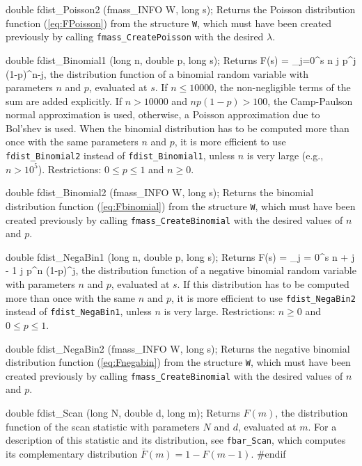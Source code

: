 double fdist_Poisson2 (fmass_INFO W, long s);
\endcode
 \tab  Returns the Poisson distribution function (\ref{eq:FPoisson})
  from the structure {\tt W}, which must have been created previously
  by calling {\tt fmass\_CreatePoisson} with the desired $\lambda$.
 \endtab
\code


double fdist_Binomial1 (long n, double p, long s);
\endcode
  \tab  Returns
  \eq
    F(s) = \sum_{j=0}^s {n \choose j}\; p^j (1-p)^{n-j},
  \endeq
  the distribution function of a binomial random variable with parameters
  $n$ and $p$, evaluated at $s$.
\ifdetailed
  If $n \le 10000$, the non-negligible terms of the sum are 
  added explicitly.
  If $n > 10000$ and $np(1-p) > 100$, the Camp-Paulson normal 
  approximation \cite{tCAM51a,tMOL70a} is used, otherwise, a Poisson
  approximation due to Bol'shev \cite{tBOL64a,tMOL70a} is used.
\fi
  When the binomial distribution has to be computed more than
  once with the same parameters $n$ and $p$, it is more efficient to use 
  {\tt fdist\_Binomial2} instead of {\tt fdist\_Binomial1}, 
  unless $n$ is very large (e.g., $n > 10^5$).
  Restrictions: $0 \le p \le 1$ and $n \ge 0$.
 \endtab
\code


double fdist_Binomial2 (fmass_INFO W, long s);
\endcode
 \tab  Returns the binomial distribution function (\ref{eq:Fbinomial})
  from the structure {\tt W}, which must have been created previously
  by calling {\tt fmass\_CreateBinomial} with the desired values of
  $n$ and $p$.
 \endtab
\code


double fdist_NegaBin1 (long n, double p, long s);
\endcode
  \tab Returns
  \eq
   F(s) = \sum_{j = 0}^s {n + j - 1 \choose j} p^n (1-p)^{j},
  \endeq
  the distribution function of a negative binomial random variable with
  parameters $n$ and $p$, evaluated at $s$. 
  If this distribution has to be computed more than
  once with the same $n$ and $p$, it is more efficient to use 
  {\tt fdist\_NegaBin2} instead of {\tt fdist\_NegaBin1},
  unless $n$ is very large. 
  Restrictions: $n \ge 0$ and $0 \le p \le 1$.
 \endtab
\code


double fdist_NegaBin2 (fmass_INFO W, long s);
\endcode
 \tab  Returns the negative binomial distribution function 
  (\ref{eq:Fnegabin}) from the structure {\tt W}, 
  which must have been created previously
  by calling {\tt fmass\_CreateBinomial} with the desired values of
  $n$ and $p$.
 \endtab
\code


double fdist_Scan (long N, double d, long m);
\endcode
 \tab Returns $F(m)$, the distribution function of the scan statistic
  with parameters $N$ and $d$, evaluated at $m$.
  For a description of this statistic and its distribution, see 
  {\tt fbar\_Scan}, which computes its complementary distribution
  $\bar F(m) = 1 - F(m-1)$.
 \endtab
\code
\hide
#endif
\endhide
\endcode
